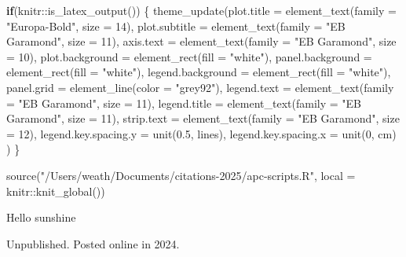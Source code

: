 \documentclass[
  10pt,
  letterpaper,
  DIV=11,
  numbers=noendperiod,
  twoside]{scrartcl}
\newenvironment{Shaded}{\begin{snugshade}}{\end{snugshade}}
\newcommand{\AttributeTok}[1]{\textcolor[rgb]{0.40,0.45,0.13}{#1}}
\newcommand{\ControlFlowTok}[1]{\textcolor[rgb]{0.00,0.23,0.31}{\textbf{#1}}}
\newcommand{\DecValTok}[1]{\textcolor[rgb]{0.68,0.00,0.00}{#1}}
\newcommand{\FloatTok}[1]{\textcolor[rgb]{0.68,0.00,0.00}{#1}}
\newcommand{\FunctionTok}[1]{\textcolor[rgb]{0.28,0.35,0.67}{#1}}
\newcommand{\NormalTok}[1]{\textcolor[rgb]{0.00,0.23,0.31}{#1}}
\newcommand{\SpecialCharTok}[1]{\textcolor[rgb]{0.37,0.37,0.37}{#1}}
\newcommand{\StringTok}[1]{\textcolor[rgb]{0.13,0.47,0.30}{#1}}
\begin{document}
\begin{Shaded}
\begin{Highlighting}[]
\ControlFlowTok{if}\NormalTok{(knitr}\SpecialCharTok{::}\FunctionTok{is\_latex\_output}\NormalTok{()) \{}
\FunctionTok{theme\_update}\NormalTok{(}\AttributeTok{plot.title =} \FunctionTok{element\_text}\NormalTok{(}\AttributeTok{family =} \StringTok{"Europa{-}Bold"}\NormalTok{, }\AttributeTok{size =} \DecValTok{14}\NormalTok{),}
             \AttributeTok{plot.subtitle =} \FunctionTok{element\_text}\NormalTok{(}\AttributeTok{family =} \StringTok{"EB Garamond"}\NormalTok{, }\AttributeTok{size =} \DecValTok{11}\NormalTok{),}
             \AttributeTok{axis.text =} \FunctionTok{element\_text}\NormalTok{(}\AttributeTok{family =} \StringTok{"EB Garamond"}\NormalTok{, }\AttributeTok{size =} \DecValTok{10}\NormalTok{),}
             \AttributeTok{plot.background =} \FunctionTok{element\_rect}\NormalTok{(}\AttributeTok{fill =} \StringTok{"white"}\NormalTok{),}
             \AttributeTok{panel.background =} \FunctionTok{element\_rect}\NormalTok{(}\AttributeTok{fill =} \StringTok{"white"}\NormalTok{),}
             \AttributeTok{legend.background =} \FunctionTok{element\_rect}\NormalTok{(}\AttributeTok{fill =} \StringTok{"white"}\NormalTok{),}
             \AttributeTok{panel.grid =} \FunctionTok{element\_line}\NormalTok{(}\AttributeTok{color =} \StringTok{"grey92"}\NormalTok{),}
             \AttributeTok{legend.text =} \FunctionTok{element\_text}\NormalTok{(}\AttributeTok{family =} \StringTok{"EB Garamond"}\NormalTok{, }\AttributeTok{size =} \DecValTok{11}\NormalTok{),}
            \AttributeTok{legend.title =} \FunctionTok{element\_text}\NormalTok{(}\AttributeTok{family =} \StringTok{"EB Garamond"}\NormalTok{, }\AttributeTok{size =} \DecValTok{11}\NormalTok{),}
             \AttributeTok{strip.text =} \FunctionTok{element\_text}\NormalTok{(}\AttributeTok{family =} \StringTok{"EB Garamond"}\NormalTok{, }\AttributeTok{size =} \DecValTok{12}\NormalTok{),}
             \AttributeTok{legend.key.spacing.y =} \FunctionTok{unit}\NormalTok{(}\FloatTok{0.5}\NormalTok{, }\StringTok{\textquotesingle{}lines\textquotesingle{}}\NormalTok{),}
             \AttributeTok{legend.key.spacing.x =} \FunctionTok{unit}\NormalTok{(}\DecValTok{0}\NormalTok{, }\StringTok{\textquotesingle{}cm\textquotesingle{}}\NormalTok{)}
\NormalTok{  )}
\NormalTok{\}}
\end{Highlighting}
\end{Shaded}

\begin{Shaded}
\begin{Highlighting}[]
\FunctionTok{source}\NormalTok{(}\StringTok{"/Users/weath/Documents/citations{-}2025/apc{-}scripts.R"}\NormalTok{, }\AttributeTok{local =}\NormalTok{ knitr}\SpecialCharTok{::}\FunctionTok{knit\_global}\NormalTok{())}
\end{Highlighting}
\end{Shaded}

Hello sunshine



\noindent Unpublished. Posted online in 2024.
\end{document}
